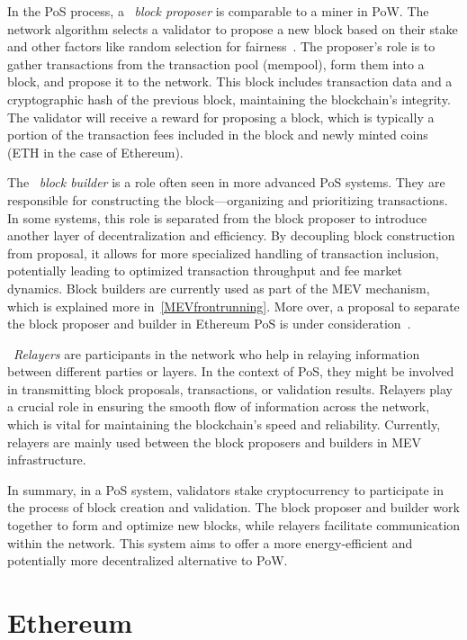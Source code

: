 In the PoS process, a ~\textit{block proposer} is comparable to a miner in PoW. The network algorithm selects a validator to propose a new block based on their stake and other factors like random selection for fairness~\cite{ethereumrandao}. The proposer's role is to gather transactions from the transaction pool (mempool), form them into a block, and propose it to the network. This block includes transaction data and a cryptographic hash of the previous block, maintaining the blockchain's integrity. The validator will receive a reward for proposing a block, which is typically a portion of the transaction fees included in the block and newly minted coins (ETH in the case of Ethereum).

The ~\textit{block builder} is a role often seen in more advanced PoS systems. They are responsible for constructing the block---organizing and prioritizing transactions. In some systems, this role is separated from the block proposer to introduce another layer of decentralization and efficiency. By decoupling block construction from proposal, it allows for more specialized handling of transaction inclusion, potentially leading to optimized transaction throughput and fee market dynamics. Block builders are currently used as part of the MEV mechanism, which is explained more in~\ref{MEVfrontrunning}. More over, a proposal to separate the block proposer and builder in Ethereum PoS is under consideration~\cite{ethereumPBS}.

~\textit{Relayers} are participants in the network who help in relaying information between different parties or layers. In the context of PoS, they might be involved in transmitting block proposals, transactions, or validation results. Relayers play a crucial role in ensuring the smooth flow of information across the network, which is vital for maintaining the blockchain's speed and reliability. Currently, relayers are mainly used between the block proposers and builders in MEV infrastructure.

In summary, in a PoS system, validators stake cryptocurrency to participate in the process of block creation and validation. The block proposer and builder work together to form and optimize new blocks, while relayers facilitate communication within the network. This system aims to offer a more energy-efficient and potentially more decentralized alternative to PoW.




\section{Ethereum}


